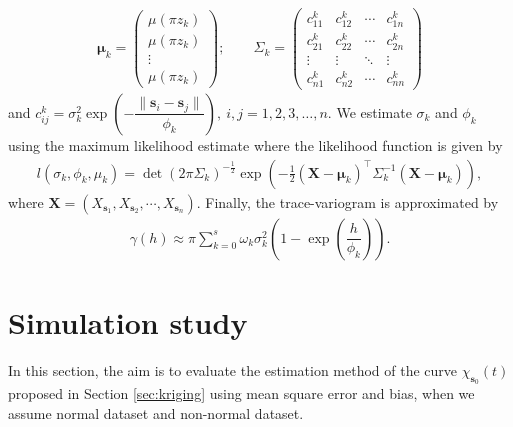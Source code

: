 \documentclass[]{interact}
\theoremstyle{plain}%
\theoremstyle{definition}
\theoremstyle{remark}
\begin{document}
\begin{align*}
 \bm{\mu}_k = \begin{pmatrix}
             \mu(\pi z_k)\\
             \mu(\pi z_k)\\
             \vdots\\
             \mu(\pi z_k)
            \end{pmatrix};
            \qquad
    \Sigma_k = \begin{pmatrix}
              c_{11}^k & c_{12}^k & \cdots & c_{1n}^k\\
              c_{21}^k & c_{22}^k & \cdots & c_{2n}^k\\
              \vdots & \vdots & \ddots & \vdots \\
              c_{n1}^k & c_{n2}^k & \cdots & c_{nn}^k
             \end{pmatrix}
\end{align*}
and \(c_{ij}^k = \sigma_k^2 \exp \left( -\dfrac{\lVert \bm{s}_i -\bm{s}_j\rVert}{\phi_k} \right),\ i,j=1,2,3,\dots, n\).
We estimate \(\sigma_k\) and \(\phi_k\) using the maximum likelihood estimate where the likelihood function is given by
\begin{align*}
 l(\sigma_k, \phi_k, \mu_k) = \det (2 \pi \Sigma_k)^{-\frac{1}{2}} \exp \left(  -\frac{1}{2} (\bm{X}-\bm{\mu}_k)^\top \Sigma_k^{-1} (\bm{X}-\bm{\mu}_k) \right),
\end{align*}
where \(\bm{X} = \left( X_{\bm{s}_1}, X_{\bm{s}_2}, \cdots, X_{\bm{s}_n} \right)\). Finally, the trace-variogram is approximated by
\begin{align*}
 \gamma(h) \approx \pi \sum_{k=0}^{s} \omega_k \sigma_k^2\left(1- \exp \left( \dfrac{h}{\phi_k} \right) \right).
\end{align*}

\hypertarget{sec:simulation}{%
\section{Simulation study}\label{sec:simulation}}

In this section, the aim is to evaluate the estimation method of the curve \(\chi_{\bm{s}_0}(t)\) proposed in Section \ref{sec:kriging} using mean square error and bias, when we assume normal dataset and non-normal dataset.
\end{document}
